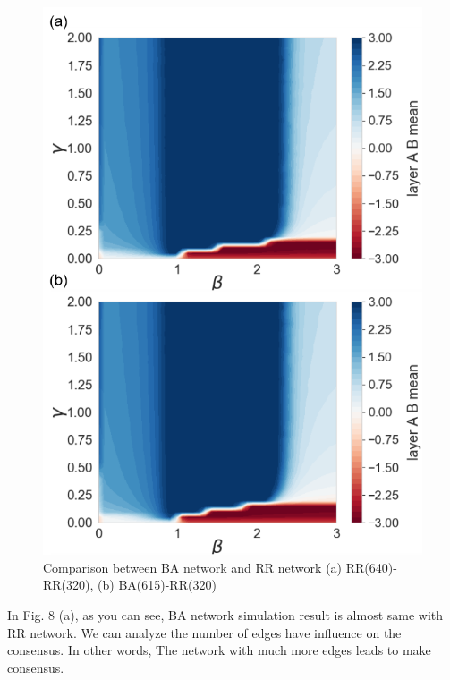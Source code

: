 \documentclass[english]{cccconf}
\begin{document}
\begin{figure}[!htb]
  \centering
  \includegraphics[width=\hsize]{FIG8.png}
  \caption{Comparison between BA network and RR network (a) RR(640)-RR(320), (b) BA(615)-RR(320)}
  \label{Fig8}
\end{figure}
In Fig. 8 (a), as you can see, BA network simulation result is almost same with RR network. We can analyze the number of edges have influence on the consensus. In other words, The network with much more edges leads to make consensus.
\end{document}
